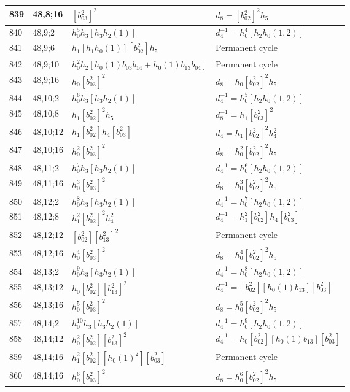 \documentclass{article}
\begin{document}
\begin{longtable}{|l|l|>{\raggedright\arraybackslash}p{6cm}|>{\raggedright\arraybackslash}p{6cm}|}
\hline
839 & 48,8;16 & $[b_{03}^2]^2$ &$d_{8}=[b_{02}^2]^2h_5$\\
\hline
840 & 48,9;2 & $h_0^5h_3[h_3h_2(1)]$ & $d_{4}^{-1}=h_0^4[h_2h_0(1, 2)]$\\
\hline
841 & 48,9;6 & $h_1[h_1h_0(1)][b_{02}^2]h_5$ & Permanent cycle\\
\hline
842 & 48,9;10 & $h_0^2h_2[h_0(1)b_{03}b_{14} + h_0(1)b_{13}b_{04}]$ & Permanent cycle\\
\hline
843 & 48,9;16 & $h_0[b_{03}^2]^2$ &$d_{8}=h_0[b_{02}^2]^2h_5$\\
\hline
844 & 48,10;2 & $h_0^6h_3[h_3h_2(1)]$ & $d_{4}^{-1}=h_0^5[h_2h_0(1, 2)]$\\
\hline
845 & 48,10;8 & $h_1[b_{02}^2]^2h_5$ & $d_{8}^{-1}=h_1[b_{03}^2]^2$\\
\hline
846 & 48,10;12 & $h_1[b_{02}^2]h_4[b_{03}^2]$ &$d_{4}=h_1[b_{02}^2]^2h_4^2$\\
\hline
847 & 48,10;16 & $h_0^2[b_{03}^2]^2$ &$d_{8}=h_0^2[b_{02}^2]^2h_5$\\
\hline
848 & 48,11;2 & $h_0^7h_3[h_3h_2(1)]$ & $d_{4}^{-1}=h_0^6[h_2h_0(1, 2)]$\\
\hline
849 & 48,11;16 & $h_0^3[b_{03}^2]^2$ &$d_{8}=h_0^3[b_{02}^2]^2h_5$\\
\hline
850 & 48,12;2 & $h_0^8h_3[h_3h_2(1)]$ & $d_{4}^{-1}=h_0^7[h_2h_0(1, 2)]$\\
\hline
851 & 48,12;8 & $h_1^2[b_{02}^2]^2h_4^2$ & $d_{4}^{-1}=h_1^2[b_{02}^2]h_4[b_{03}^2]$\\
\hline
852 & 48,12;12 & $[b_{02}^2][b_{13}^2]^2$ & Permanent cycle\\
\hline
853 & 48,12;16 & $h_0^4[b_{03}^2]^2$ &$d_{8}=h_0^4[b_{02}^2]^2h_5$\\
\hline
854 & 48,13;2 & $h_0^9h_3[h_3h_2(1)]$ & $d_{4}^{-1}=h_0^8[h_2h_0(1, 2)]$\\
\hline
855 & 48,13;12 & $h_0[b_{02}^2][b_{13}^2]^2$ & $d_{4}^{-1}=[b_{02}^2][h_0(1)b_{13}][b_{03}^2]$\\
\hline
856 & 48,13;16 & $h_0^5[b_{03}^2]^2$ &$d_{8}=h_0^5[b_{02}^2]^2h_5$\\
\hline
857 & 48,14;2 & $h_0^{10}h_3[h_3h_2(1)]$ & $d_{4}^{-1}=h_0^9[h_2h_0(1, 2)]$\\
\hline
858 & 48,14;12 & $h_0^2[b_{02}^2][b_{13}^2]^2$ & $d_{4}^{-1}=h_0[b_{02}^2][h_0(1)b_{13}][b_{03}^2]$\\
\hline
859 & 48,14;16 & $h_1^2[b_{02}^2][h_0(1)^2][b_{03}^2]$ & Permanent cycle\\
860 & 48,14;16 & $h_0^6[b_{03}^2]^2$ &$d_{8}=h_0^6[b_{02}^2]^2h_5$\\

\end{longtable}
\end{document}
